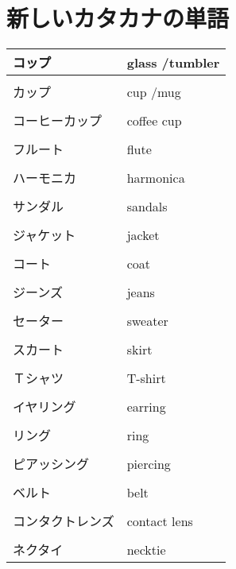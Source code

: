 \documentclass{article}
\begin{document}
\section{新しいカタカナの単語}
\begin{tabular}{ l | l }
コップ & glass /tumbler \\ \hline\\[-1em]
カップ & cup /mug \\ \hline\\[-1em]
コーヒーカップ & coffee cup \\ \hline\\[-1em]
フルート & flute \\ \hline\\[-1em]
ハーモニカ & harmonica \\ \hline\\[-1em]
サンダル & sandals \\ \hline\\[-1em]
ジャケット & jacket \\ \hline\\[-1em]
コート & coat \\ \hline\\[-1em]
ジーンズ & jeans \\ \hline\\[-1em]
セーター & sweater	 \\ \hline\\[-1em]
スカート & skirt \\ \hline\\[-1em]
Ｔシャツ & T-shirt \\ \hline\\[-1em]
イヤリング & earring \\ \hline\\[-1em]
リング & ring \\ \hline\\[-1em]
ピアッシング & piercing \\ \hline\\[-1em]
ベルト	 & belt \\ \hline\\[-1em]
コンタクトレンズ & contact lens​ \\ \hline\\[-1em]
ネクタイ & necktie %
\end{tabular}
\end{document}
